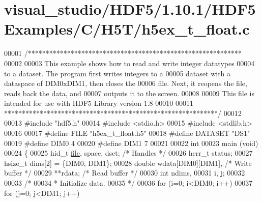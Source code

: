 \hypertarget{visual__studio_2_h_d_f5_21_810_81_2_h_d_f5_examples_2_c_2_h5_t_2h5ex__t__float_8c_source}{}\section{visual\+\_\+studio/\+H\+D\+F5/1.10.1/\+H\+D\+F5\+Examples/\+C/\+H5\+T/h5ex\+\_\+t\+\_\+float.c}
\label{visual__studio_2_h_d_f5_21_810_81_2_h_d_f5_examples_2_c_2_h5_t_2h5ex__t__float_8c_source}

\begin{DoxyCode}
00001 \textcolor{comment}{/************************************************************}
00002 \textcolor{comment}{}
00003 \textcolor{comment}{  This example shows how to read and write integer datatypes}
00004 \textcolor{comment}{  to a dataset.  The program first writes integers to a}
00005 \textcolor{comment}{  dataset with a dataspace of DIM0xDIM1, then closes the}
00006 \textcolor{comment}{  file.  Next, it reopens the file, reads back the data, and}
00007 \textcolor{comment}{  outputs it to the screen.}
00008 \textcolor{comment}{}
00009 \textcolor{comment}{  This file is intended for use with HDF5 Library version 1.8}
00010 \textcolor{comment}{}
00011 \textcolor{comment}{ ************************************************************/}
00012 
00013 \textcolor{preprocessor}{#include "hdf5.h"}
00014 \textcolor{preprocessor}{#include <stdio.h>}
00015 \textcolor{preprocessor}{#include <stdlib.h>}
00016 
00017 \textcolor{preprocessor}{#define FILE            "h5ex\_t\_float.h5"}
00018 \textcolor{preprocessor}{#define DATASET         "DS1"}
00019 \textcolor{preprocessor}{#define DIM0            4}
00020 \textcolor{preprocessor}{#define DIM1            7}
00021 
00022 \textcolor{keywordtype}{int}
00023 main (\textcolor{keywordtype}{void})
00024 \{
00025     hid\_t       \hyperlink{structfile}{file}, space, dset;          \textcolor{comment}{/* Handles */}
00026     herr\_t      status;
00027     hsize\_t     dims[2] = \{DIM0, DIM1\};
00028     \textcolor{keywordtype}{double}      wdata[DIM0][DIM1],          \textcolor{comment}{/* Write buffer */}
00029                 **rdata;                    \textcolor{comment}{/* Read buffer */}
00030     \textcolor{keywordtype}{int}         ndims,
00031                 i, j;
00032 
00033     \textcolor{comment}{/*}
00034 \textcolor{comment}{     * Initialize data.}
00035 \textcolor{comment}{     */}
00036     \textcolor{keywordflow}{for} (i=0; i<DIM0; i++)
00037         \textcolor{keywordflow}{for} (j=0; j<DIM1; j++)

\end{DoxyCode}
